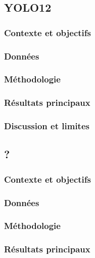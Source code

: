 {{{{\subsection{YOLO12}

\subsubsection{Contexte et objectifs}

\subsubsection{Données}

\subsubsection{Méthodologie}

\subsubsection{Résultats principaux}

\subsubsection{Discussion et limites}

\subsection{?}

\subsubsection{Contexte et objectifs}

\subsubsection{Données}

\subsubsection{Méthodologie}

\subsubsection{Résultats principaux}

}}}}
